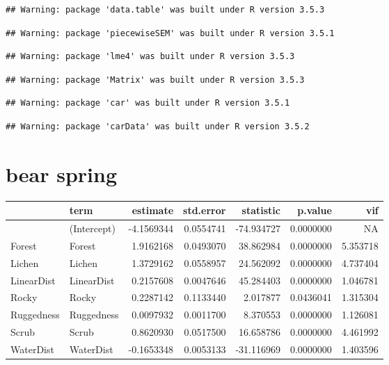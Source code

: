 \documentclass[]{article}
\title{}
\author{}
\date{}
\begin{document}
\clearpage

\begin{verbatim}
## Warning: package 'data.table' was built under R version 3.5.3
\end{verbatim}

\begin{verbatim}
## Warning: package 'piecewiseSEM' was built under R version 3.5.1
\end{verbatim}

\begin{verbatim}
## Warning: package 'lme4' was built under R version 3.5.3
\end{verbatim}

\begin{verbatim}
## Warning: package 'Matrix' was built under R version 3.5.3
\end{verbatim}

\begin{verbatim}
## Warning: package 'car' was built under R version 3.5.1
\end{verbatim}

\begin{verbatim}
## Warning: package 'carData' was built under R version 3.5.2
\end{verbatim}

\section{bear spring}\label{bear-spring}

\begin{tabular}{llrrrrr}
\toprule
  & term & estimate & std.error & statistic & p.value & vif\\
\midrule
 & (Intercept) & -4.1569344 & 0.0554741 & -74.934727 & 0.0000000 & NA\\
Forest & Forest & 1.9162168 & 0.0493070 & 38.862984 & 0.0000000 & 5.353718\\
Lichen & Lichen & 1.3729162 & 0.0558957 & 24.562092 & 0.0000000 & 4.737404\\
LinearDist & LinearDist & 0.2157608 & 0.0047646 & 45.284403 & 0.0000000 & 1.046781\\
Rocky & Rocky & 0.2287142 & 0.1133440 & 2.017877 & 0.0436041 & 1.315304\\
Ruggedness & Ruggedness & 0.0097932 & 0.0011700 & 8.370553 & 0.0000000 & 1.126081\\
Scrub & Scrub & 0.8620930 & 0.0517500 & 16.658786 & 0.0000000 & 4.461992\\
WaterDist & WaterDist & -0.1653348 & 0.0053133 & -31.116969 & 0.0000000 & 1.403596\\
\bottomrule
\end{tabular}
\end{document}
